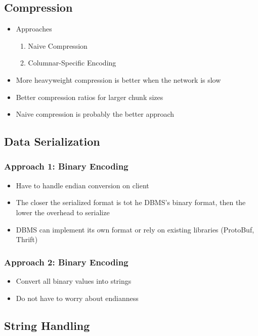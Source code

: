 \documentclass[11pt]{article}
\begin{document}
    \subsection*{Compression}
    \begin{itemize}
        \item Approaches
        \begin{enumerate}
            \item Naive Compression
            \item Columnar-Specific Encoding
        \end{enumerate}
        \item More heavyweight compression is better when the network is slow
        \item Better compression ratios for larger chunk sizes
        \item Naive compression is probably the better approach
    \end{itemize}


    \subsection*{Data Serialization}
        \subsubsection*{Approach 1: Binary Encoding}
        \begin{itemize}
            \item Have to handle endian conversion on client
            \item The closer the serialized format is tot he DBMS's binary format, then the lower the overhead to serialize
            \item DBMS can implement its own format or rely on existing libraries (ProtoBuf, Thrift)
        \end{itemize}

        \subsubsection*{Approach 2: Binary Encoding}
        \begin{itemize}
            \item Convert all binary values into strings
            \item Do not have to worry about endianness
        \end{itemize}


    \subsection*{String Handling}
\end{document}
